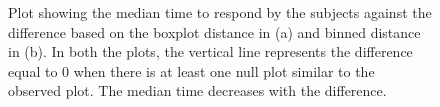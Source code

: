 \documentclass[12]{article}
\begin{document}
\begin{figure}[hbtp]
\centering
{}
\label{turk1-mtime}
	\vspace{-.1in}
\caption[Optional caption for list of figures]{Plot showing the median time to respond by the subjects against the difference based on the boxplot distance in (a) and binned distance in (b). In both the plots, the vertical line represents the difference equal to 0 when there is at least one null plot similar to the observed plot. The median time decreases with the difference.  }
\end{figure}
\end{document}
